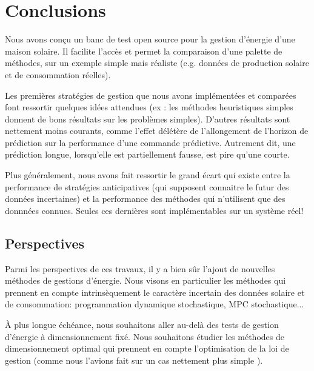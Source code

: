 \documentclass[a4paper,10pt,twocolumn]{article}
\begin{document}
% 

\section{Conclusions}

Nous avons conçu un banc de test open source pour la gestion d'énergie d'une maison solaire.
Il facilite l'accès et permet la comparaison d'une palette de méthodes,
sur un exemple simple mais réaliste (e.g. données de production solaire et de consommation réelles).

Les premières stratégies de gestion que nous avons implémentées et comparées
font ressortir quelques idées attendues
(ex : les méthodes heuristiques simples donnent de bons résultats sur les problèmes simples).
D'autres résultats sont nettement moins courants, comme l'effet délétère
de l'allongement de l'horizon de prédiction sur la performance d'une commande prédictive.
Autrement dit, une prédiction longue, lorsqu'elle est partiellement fausse, est pire qu'une courte.

Plus généralement, nous avons fait ressortir le grand écart qui existe
entre la performance de stratégies anticipatives (qui supposent connaitre le futur des données incertaines)
et la performance des méthodes qui n'utilisent que des donnnées connues.
Seules ces dernières sont implémentables sur un système réel!

\subsection{Perspectives}
Parmi les perspectives de ces travaux, il y a bien sûr l'ajout de nouvelles méthodes
de gestions d'énergie.
Nous visons en particulier les méthodes qui prennent en compte intrinsèquement
le caractère incertain des données solaire et de consommation:
programmation dynamique stochastique, MPC stochastique...

À plus longue échéance, nous souhaitons aller au-delà
des tests de gestion d'énergie à dimensionnement fixé.
Nous souhaitons étudier les méthodes de dimensionnement optimal
qui prennent en compte l'optimisation de la loi de gestion
(comme nous l'avions fait sur un cas nettement plus simple \cite{Haessig:2014:SGE}).




\end{document}
